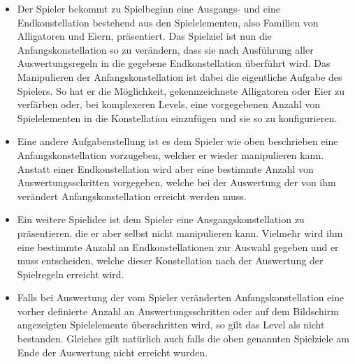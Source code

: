 	\begin{itemize}

		\item Der Spieler bekommt zu Spielbeginn eine Ausgangs- und eine Endkonstellation bestehend aus den Spielelementen, also Familien von Alligatoren und Eiern, präsentiert.
		Das Spielziel ist nun die Anfangskonstellation so zu verändern, dass sie nach Ausführung aller Auswertungsregeln in die gegebene Endkonstellation überführt wird.
		Das Manipulieren der Anfangskonstellation ist dabei die eigentliche Aufgabe des Spielers.
		So hat er die Möglichkeit, gekennzeichnete Alligatoren oder Eier zu verfärben oder, bei komplexeren Levels, eine vorgegebenen Anzahl von Spielelementen in die Konstellation einzufügen und sie so zu konfigurieren.

		\item Eine andere Aufgabenstellung ist es dem Spieler wie oben beschrieben eine Anfangskonstellation vorzugeben, welcher er wieder manipulieren kann.
		Anstatt einer Endkonstellation wird aber eine bestimmte Anzahl von Auswertungsschritten vorgegeben, welche bei der Auswertung der von ihm verändert Anfangskonstellation erreicht werden muss.

		\item Ein weitere Spielidee ist dem Spieler eine Ausgangskonstellation zu präsentieren, die er aber selbst nicht manipulieren kann.
		Vielmehr wird ihm eine bestimmte Anzahl an Endkonstellationen zur Auswahl gegeben und er muss entscheiden, welche dieser Konstellation nach der Auswertung der Spielregeln erreicht wird.

		\item Falls bei Auswertung der vom Spieler veränderten Anfangskonstellation eine vorher definierte Anzahl an Auswertungsschritten oder auf dem Bildschirm angezeigten Spielelemente überschritten wird, so gilt das Level als nicht bestanden.
		Gleiches gilt natürlich auch falls die oben genannten Spielziele am Ende der Auswertung nicht erreicht wurden.
	\end{itemize}


